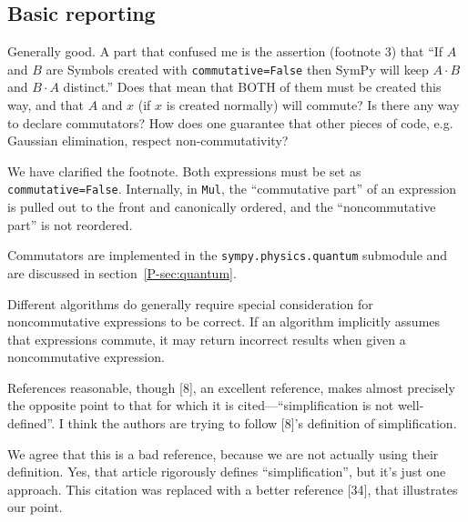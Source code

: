 \documentclass[answers,12pt]{exam}
\begin{document}
\subsection{Basic reporting}
\begin{questions}
\question Generally good. A part that confused me is the assertion (footnote 3) that ``If
$A$ and $B$ are Symbols created with \texttt{commutative=False} then SymPy will keep
$A\cdot B$
and $B\cdot A$ distinct.'' Does that mean that BOTH of them must be created this way,
and that $A$ and $x$ (if $x$ is created normally) will commute? Is there any way to
declare commutators? How does one guarantee that other pieces of code, e.g.
Gaussian elimination, respect non-commutativity?
\begin{solution}
  We have clarified the footnote. Both expressions must be set as
  \texttt{commutative=False}. Internally, in \texttt{Mul}, the ``commutative
  part'' of an expression is pulled out to the front and canonically ordered,
  and the ``noncommutative part'' is not reordered.

Commutators are implemented in the \texttt{sympy.physics.quantum} submodule and
are discussed in section~\ref{P-sec:quantum}.

Different algorithms do generally require special consideration for
noncommutative expressions to be correct. If an algorithm implicitly assumes
that expressions commute, it may return incorrect results when given a
noncommutative expression.
\end{solution}

\question References reasonable, though [8], an excellent reference, makes almost
precisely the opposite point to that for which it is cited---``simplification
is not well-defined''. I think the authors are trying to follow [8]'s
definition of simplification.
\begin{solution}
We agree that this is a bad reference, because we are not actually
using their definition.  Yes, that article rigorously defines
``simplification'', but it's just one approach.  This citation
was replaced with a better reference [34], that illustrates our point.
\end{solution}
\end{questions}
\end{document}
